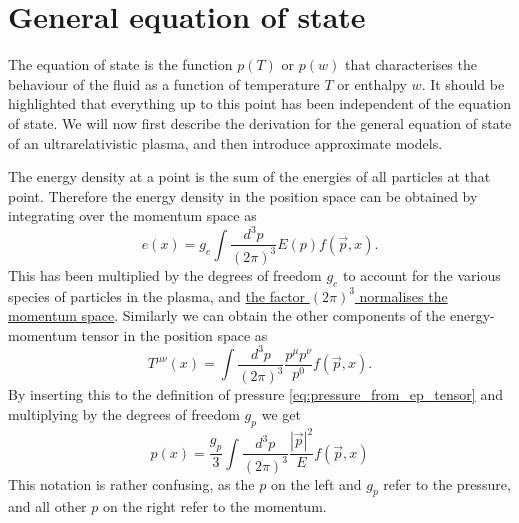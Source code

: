 \section{General equation of state}
The equation of state is the function $p(T)$ or $p(w)$ that characterises the behaviour of the fluid as a function of temperature $T$ or enthalpy $w$.
It should be highlighted that everything up to this point has been independent of the equation of state.
We will now first describe the derivation for the general equation of state of an ultrarelativistic plasma,
and then introduce approximate models.

\iffalse
In general the pressure of the ultrarelativistic ASDF
\begin{equation}
p(T,\phi) = - \sum_B f_B (m(\phi),T) - \sum_F f_F (m(\phi),T)
\end{equation}
\fi

The energy density at a point is the sum of the energies of all particles at that point.
Therefore the energy density in the position space can be obtained by integrating over the momentum space as
\cite[eq. 4.10]{lecture_notes}
\begin{equation}
e(x) = g_e \int \frac{d^3 p}{(2 \pi)^3} E(p) f(\vec{p}, x).
\end{equation}
This has been multiplied by the degrees of freedom $g_e$ to account for the various species of particles in the plasma, and
\href{https://physics.stackexchange.com/a/141737/}{the factor $(2\pi)^3$ normalises the momentum space}.
Similarly we can obtain the other components of the energy-momentum tensor in the position space as
\cite[eq. 4.13]{lecture_notes}
\begin{equation}
T^{\mu \nu}(x) = \int \frac{d^3 p}{(2 \pi)^3} \frac{p^\mu p^\nu}{p^0} f(\vec{p},x).
\end{equation}
By inserting this to the definition of pressure \eqref{eq:pressure_from_ep_tensor} and multiplying by the degrees of freedom $g_p$ we get
\begin{equation}
p(x) = \frac{g_p}{3} \int \frac{d^3 p}{(2 \pi)^3} \frac{|\vec{p}|^2}{E} f(\vec{p},x)
\end{equation}
This notation is rather confusing, as the $p$ on the left and $g_p$ refer to the pressure,
and all other $p$ on the right refer to the momentum.


